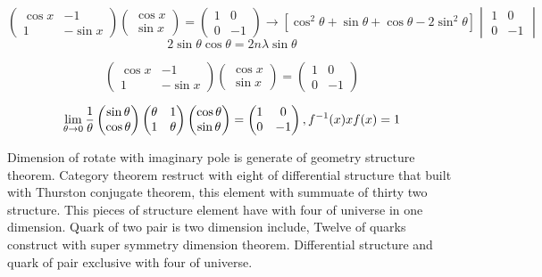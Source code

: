 \documentclass{jsarticle}
\begin{document}
$$  \begin{pmatrix} \cos x & - 1 \\
                    1  & - \sin x \end{pmatrix}
   \begin{pmatrix} \cos x \\
                   \sin x \end{pmatrix}
   =  \begin{pmatrix} 1 & 0 \\
                     0 & - 1 \end{pmatrix} 
	   \to [\cos^2\theta +  \sin\theta + \cos\theta - 2 \sin^2\theta ]\begin{vmatrix} 1 & 0 \\ 0 & - 1 \end{vmatrix} $$
		   $$  2 \sin \theta \cos \theta = 2 n \lambda \sin \theta $$

$$ \begin{pmatrix} \cos x & - 1 \\
                    1  & - \sin x \end{pmatrix}
   \begin{pmatrix} \cos x \\
                   \sin x \end{pmatrix}
   =  \begin{pmatrix} 1 & 0 \\
                     0 & - 1 \end{pmatrix} $$
	
		   $$ \lim_{\theta \to 0}{1 \over \theta} \begin{pmatrix} \sin \theta \\
			   \cos \theta \end{pmatrix} \begin{pmatrix} \theta & 1 \\
			   1 & \theta \end{pmatrix} \begin{pmatrix} \cos \theta \\
			   \sin \theta \end{pmatrix} =  \begin{pmatrix} 1 & 0 \\
			   0 & - 1 \end{pmatrix}, f^{-1}(x) x f(x) = 1 $$

 Dimension of rotate with imaginary pole is generate of geometry structure theorem.
 Category theorem restruct with eight of differential structure that built with Thurston conjugate theorem,
this element with summuate of thirty two structure.
 This pieces of structure element have with four of universe in one dimension.
Quark of two pair is two dimension include, Twelve of quarks construct with super symmetry dimension theorem.
Differential structure and quark of pair exclusive with four of universe.
\end{document}
